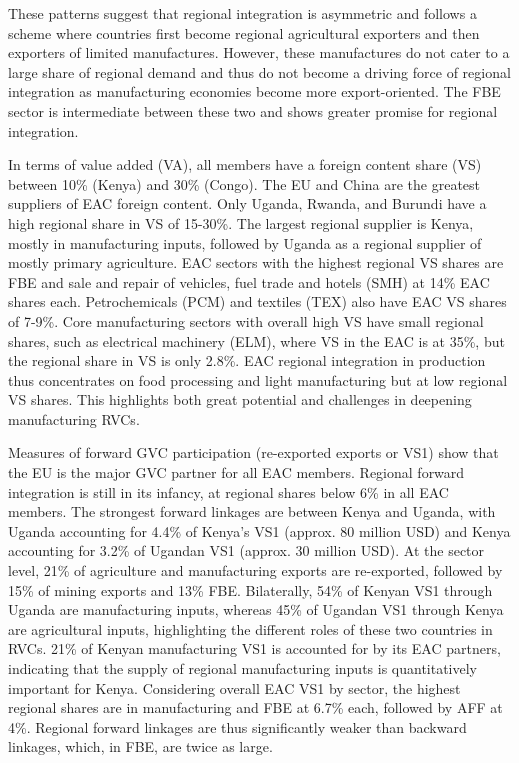 \documentclass[a4paper]{article}
\begin{document}
These patterns suggest that regional integration is asymmetric and follows a scheme where countries first become regional agricultural exporters and then exporters of limited manufactures. However, these manufactures do not cater to a large share of regional demand and thus do not become a driving force of regional integration as manufacturing economies become more export-oriented. The FBE sector is intermediate between these two and shows greater promise for regional integration. \newline

In terms of value added (VA), all members have a foreign content share (VS) between 10\% (Kenya) and 30\% (Congo). The EU and China are the greatest suppliers of EAC foreign content. Only Uganda, Rwanda, and Burundi have a high regional share in VS of 15-30\%. The largest regional supplier is Kenya, mostly in manufacturing inputs, followed by Uganda as a regional supplier of mostly primary agriculture. EAC sectors with the highest regional VS shares are FBE and sale and repair of vehicles, fuel trade and hotels (SMH) at 14\% EAC shares each. Petrochemicals (PCM) and textiles (TEX) also have EAC VS shares of 7-9\%. Core manufacturing sectors with overall high VS have small regional shares, such as electrical machinery (ELM), where VS in the EAC is at 35\%, but the regional share in VS is only 2.8\%. EAC regional integration in production thus concentrates on food processing and light manufacturing but at low regional VS shares. This highlights both great potential and challenges in deepening manufacturing RVCs.  \newline

Measures of forward GVC participation (re-exported exports or VS1) show that the EU is the major GVC partner for all EAC members. Regional forward integration is still in its infancy, at regional shares below 6\% in all EAC members. The strongest forward linkages are between Kenya and Uganda, with Uganda accounting for 4.4\% of Kenya's VS1 (approx. 80 million USD) and Kenya accounting for 3.2\% of Ugandan VS1 (approx. 30 million USD). At the sector level, 21\% of agriculture and manufacturing exports are re-exported, followed by 15\% of mining exports and 13\% FBE. Bilaterally, 54\% of Kenyan VS1 through Uganda are manufacturing inputs, whereas 45\% of Ugandan VS1 through Kenya are agricultural inputs, highlighting the different roles of these two countries in RVCs. 21\% of Kenyan manufacturing VS1 is accounted for by its EAC partners, indicating that the supply of regional manufacturing inputs is quantitatively important for Kenya. Considering overall EAC VS1 by sector, the highest regional shares are in manufacturing and FBE at 6.7\% each, followed by AFF at 4\%. Regional forward linkages are thus significantly weaker than backward linkages, which, in FBE, are twice as large. \newline
\end{document}
